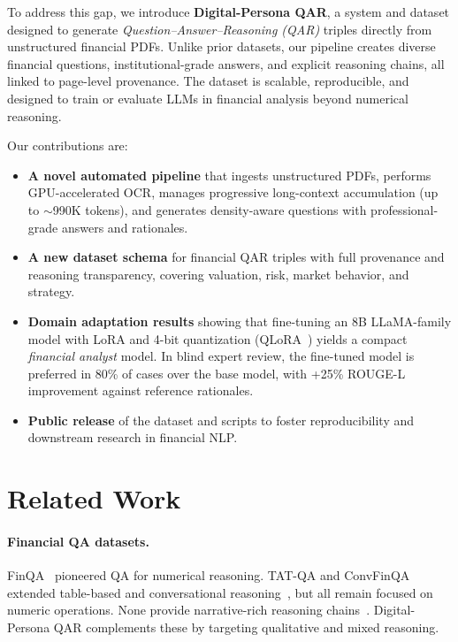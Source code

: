 \documentclass[sigconf,authordraft,anonymous]{acmart}
\begin{document}
To address this gap, we introduce \textbf{Digital-Persona QAR}, a system and dataset designed to generate \emph{Question--Answer--Reasoning (QAR)} triples directly from unstructured financial PDFs. Unlike prior datasets, our pipeline creates diverse financial questions, institutional-grade answers, and explicit reasoning chains, all linked to page-level provenance. The dataset is scalable, reproducible, and designed to train or evaluate LLMs in financial analysis beyond numerical reasoning.

Our contributions are:
\begin{itemize}
  \item \textbf{A novel automated pipeline} that ingests unstructured PDFs, performs GPU-accelerated OCR, manages progressive long-context accumulation (up to $\sim$990K tokens), and generates density-aware questions with professional-grade answers and rationales.
  \item \textbf{A new dataset schema} for financial QAR triples with full provenance and reasoning transparency, covering valuation, risk, market behavior, and strategy.
  \item \textbf{Domain adaptation results} showing that fine-tuning an 8B LLaMA-family model with LoRA and 4-bit quantization (QLoRA~\cite{dettmers2023qloraefficientfinetuningquantized}) yields a compact \emph{financial analyst} model. In blind expert review, the fine-tuned model is preferred in 80\% of cases over the base model, with +25\% ROUGE-L improvement against reference rationales.
  \item \textbf{Public release} of the dataset and scripts to foster reproducibility and downstream research in financial NLP.
\end{itemize}

\section{Related Work}
\paragraph{Financial QA datasets.}
FinQA~\cite{chen2022finqadatasetnumericalreasoning} pioneered QA for numerical reasoning. TAT-QA and ConvFinQA extended table-based and conversational reasoning~\cite{Zhu2021TATQA,Chen2022ConvFinQA}, but all remain focused on numeric operations. None provide narrative-rich reasoning chains~\cite{Reddy2024DocFinQA}. Digital-Persona QAR complements these by targeting qualitative and mixed reasoning.
\end{document}
